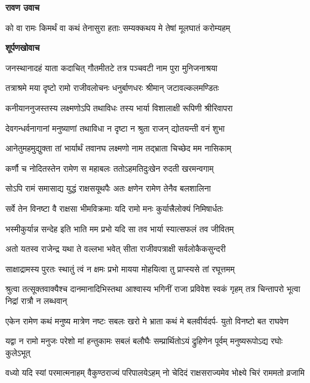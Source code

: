 \textbf{रावण उवाच}

\twolineshloka
{को वा रामः किमर्थं वा कथं तेनासुरा हताः}
{सम्यक्कथय मे तेषां मूलघातं करोम्यहम्} %

\textbf{शूर्पणखोवाच}

\twolineshloka
{जनस्थानादहं याता कदाचित् गौतमीतटे}
{तत्र पञ्चवटी नाम पुरा मुनिजनाश्रया} %

\twolineshloka
{तत्राश्रमे मया दृष्टो रामो राजीवलोचनः}
{धनुर्बाणधरः श्रीमान् जटावल्कलमण्डितः} %

\twolineshloka
{कनीयाननुजस्तस्य लक्ष्मणोऽपि तथाविधः}
{तस्य भार्या विशालाक्षी रूपिणी श्रीरिवापरा} %

\twolineshloka
{देवगन्धर्वनागानां मनुष्याणां तथाविधा}
{न दृष्टा न श्रुता राजन् द्योतयन्ती वनं शुभा} %

\twolineshloka
{आनेतुमहमुद्युक्ता तां भार्यार्थं तवानघ}
{लक्ष्मणो नाम तद्भ्राता चिच्छेद मम नासिकाम्} %

\twolineshloka
{कर्णौ च नोदितस्तेन रामेण स महाबलः}
{ततोऽहमतिदुःखेन रुदती खरमन्वगाम्} %

\twolineshloka
{सोऽपि रामं समासाद्य युद्धं राक्षसयूथपैः}
{अतः क्षणेन रामेण तेनैव बलशालिना} %

\twolineshloka
{सर्वे तेन विनष्टा वै राक्षसा भीमविक्रमाः}
{यदि रामो मनः कुर्यात्त्रैलोक्यं निमिषार्धतः} %

\twolineshloka
{भस्मीकुर्यान्न सन्देह इति भाति मम प्रभो}
{यदि सा तव भार्या स्यात्सफलं तव जीवितम्} %

\twolineshloka
{अतो यतस्व राजेन्द्र यथा ते वल्लभा भवेत्}
{सीता राजीवपत्राक्षी सर्वलोकैकसुन्दरी} %

\twolineshloka
{साक्षाद्रामस्य पुरतः स्थातुं त्वं न क्षमः प्रभो}
{मायया मोहयित्वा तु प्राप्स्यसे तां रघूत्तमम्} %

\threelineshloka
{श्रुत्वा तत्सूक्तवाक्यैश्च दानमानादिभिस्तथा}
{आश्वास्य भगिनीं राजा प्रविवेश स्वकं गृहम्}
{तत्र चिन्तापरो भूत्वा निद्रां रात्रौ न लब्धवान्} %

\fourlineindentedshloka
{एकेन रामेण कथं मनुष्य}
{मात्रेण नष्टः सबलः खरो मे}
{भ्राता कथं मे बलवीर्यदर्प-}
{युतो विनष्टो बत राघवेण} %

\fourlineindentedshloka
{यद्वा न रामो मनुजः परेशो}
{मां हन्तुकामः सबलं बलौघैः}
{सम्प्रार्थितोऽयं द्रुहिणेन पूर्वम्}
{मनुष्यरूपोऽद्य रघोः कुलेऽभूत्} %

\fourlineindentedshloka
{वध्यो यदि स्यां परमात्मनाहम्}
{वैकुण्ठराज्यं परिपालयेऽहम्}
{नो चेदिदं राक्षसराज्यमेव}
{भोक्ष्ये चिरं राममतो व्रजामि} %

